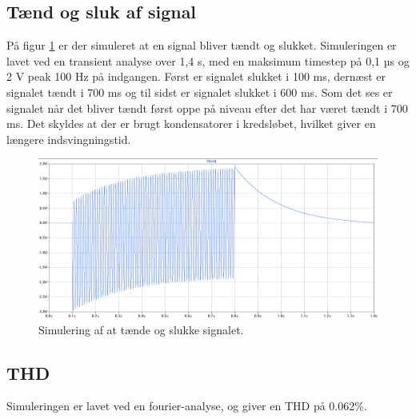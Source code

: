 \subsection*{Tænd og sluk af signal}
På figur \ref{indgangsvaelger_taendsluk} er der simuleret at en signal bliver tændt og slukket. Simuleringen er lavet ved en transient analyse over 1,4 s, med en maksimum timestep på 0,1 µs og 2 V peak 100 Hz på indgangen. Først er signalet slukket i 100 ms, dernæst er signalet tændt i 700 ms og til sidst er signalet slukket i 600 ms. Som det ses er signalet når det bliver tændt først oppe på niveau efter det har været tændt i 700 ms. Det skyldes at der er brugt kondensatorer i kredsløbet, hvilket giver en længere indsvingningstid.
\begin{figure}[h]
\centering
\includegraphics[scale=0.3]{teknisk/indgangsvaelger/simulering/taend_sluk.png}
\caption{Simulering af at tænde og slukke signalet.}
\label{indgangsvaelger_taendsluk}
\end{figure}

\subsection*{THD}
Simuleringen er lavet ved en fourier-analyse, og giver en THD på 0.062\%.
